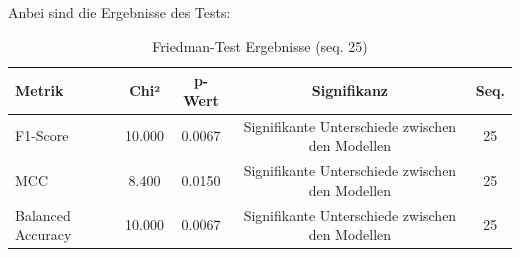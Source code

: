 \documentclass[a4paper,12pt]{article}
\begin{document}
	Anbei sind die Ergebnisse des Tests:
	
	\begin{table}[H]
		\centering
		\caption{Friedman-Test Ergebnisse (seq. 25)}
		\begin{tabular}{lcccc}
			\toprule
			\textbf{Metrik} & \textbf{Chi²} & \textbf{p-Wert} & \textbf{Signifikanz} & \textbf{Seq.} \\
			\midrule
			F1-Score          & 10.000 & 0.0067 & Signifikante Unterschiede zwischen den Modellen & 25 \\
			MCC               &  8.400 & 0.0150 & Signifikante Unterschiede zwischen den Modellen & 25 \\
			Balanced Accuracy & 10.000 & 0.0067 & Signifikante Unterschiede zwischen den Modellen & 25 \\
			\bottomrule
		\end{tabular}
	\end{table}
	
\end{document}
